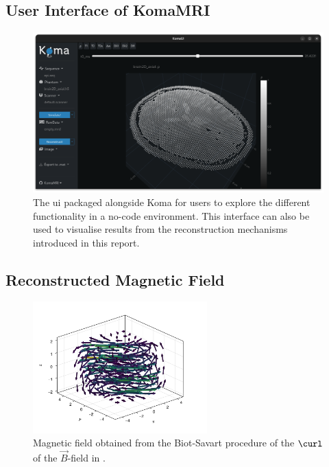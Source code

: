 \documentclass[10pt]{article}
\begin{document}
  \subsection{User Interface of KomaMRI}
  \begin{figure}[H]
    \centering
    \includegraphics[width=\linewidth]{../figures/komaui.png}
    \caption{The \gls{ui} packaged alongside Koma for users to explore the different functionality in a no-code environment. This interface can also be used to visualise results from the reconstruction mechanisms introduced in this report.}
    \label{fig:komaui}
  \end{figure}

  \subsection{Reconstructed Magnetic Field}
  \begin{figure}[H]
    \centering
    \includegraphics[width=0.6\textwidth]{../figures/cdpbr-b-field.pdf}
    \caption{Magnetic field obtained from the Biot-Savart procedure of the $\curl$ of the $\vec{B}$-field in .}
    \label{fig:cdpbr-b-field}
  \end{figure}
\end{document}
